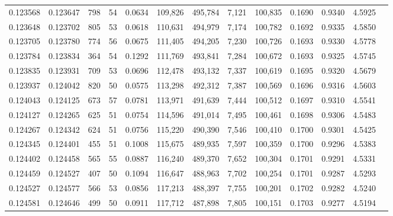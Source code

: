 \begin{tabular}{rrrrrrrrrrrrr}
0.123568 & 0.123647 &   798 &  54 &                                     0.0634 & 109,826 & 495,784 &   7,121 & 100,835 & 0.1690 & 0.9340 & 4.5925 \\
0.123648 & 0.123702 &   805 &  53 &                                     0.0618 & 110,631 & 494,979 &   7,174 & 100,782 & 0.1692 & 0.9335 & 4.5850 \\
0.123705 & 0.123780 &   774 &  56 &                                     0.0675 & 111,405 & 494,205 &   7,230 & 100,726 & 0.1693 & 0.9330 & 4.5778 \\
0.123784 & 0.123834 &   364 &  54 &                                     0.1292 & 111,769 & 493,841 &   7,284 & 100,672 & 0.1693 & 0.9325 & 4.5745 \\
0.123835 & 0.123931 &   709 &  53 &                                     0.0696 & 112,478 & 493,132 &   7,337 & 100,619 & 0.1695 & 0.9320 & 4.5679 \\
0.123937 & 0.124042 &   820 &  50 &                                     0.0575 & 113,298 & 492,312 &   7,387 & 100,569 & 0.1696 & 0.9316 & 4.5603 \\
0.124043 & 0.124125 &   673 &  57 &                                     0.0781 & 113,971 & 491,639 &   7,444 & 100,512 & 0.1697 & 0.9310 & 4.5541 \\
0.124127 & 0.124265 &   625 &  51 &                                     0.0754 & 114,596 & 491,014 &   7,495 & 100,461 & 0.1698 & 0.9306 & 4.5483 \\
0.124267 & 0.124342 &   624 &  51 &                                     0.0756 & 115,220 & 490,390 &   7,546 & 100,410 & 0.1700 & 0.9301 & 4.5425 \\
0.124345 & 0.124401 &   455 &  51 &                                     0.1008 & 115,675 & 489,935 &   7,597 & 100,359 & 0.1700 & 0.9296 & 4.5383 \\
0.124402 & 0.124458 &   565 &  55 &                                     0.0887 & 116,240 & 489,370 &   7,652 & 100,304 & 0.1701 & 0.9291 & 4.5331 \\
0.124459 & 0.124527 &   407 &  50 &                                     0.1094 & 116,647 & 488,963 &   7,702 & 100,254 & 0.1701 & 0.9287 & 4.5293 \\
0.124527 & 0.124577 &   566 &  53 &                                     0.0856 & 117,213 & 488,397 &   7,755 & 100,201 & 0.1702 & 0.9282 & 4.5240 \\
0.124581 & 0.124646 &   499 &  50 &                                     0.0911 & 117,712 & 487,898 &   7,805 & 100,151 & 0.1703 & 0.9277 & 4.5194 \\

\end{tabular}

